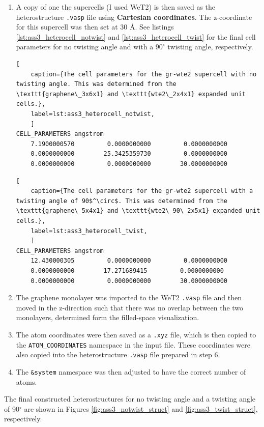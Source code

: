 \documentclass[10pt,a4paper]{labreport}
\begin{document}
\begin{enumerate}
  \item A copy of one the supercells (I used WeT2) is then saved as the heterostructure \texttt{.vasp} file using \textbf{Cartesian coordinates}. The z-coordinate for this supercell was then set at 30 \AA. See listings \ref{lst:ass3_heterocell_notwist} and \ref{lst:ass3_heterocell_twist} for the final cell parameters for no twisting angle and with a $90^\circ$ twisting angle, respectively.
\begin{lstlisting}[ 
    caption={The cell parameters for the gr-wte2 supercell with no twisting angle. This was determined from the \texttt{graphene\_3x6x1} and \texttt{wte2\_2x4x1} expanded unit cells.},
    label=lst:ass3_heterocell_notwist,
    ]
CELL_PARAMETERS angstrom
    7.1900000570         0.0000000000         0.0000000000
    0.0000000000        25.3425359730         0.0000000000
    0.0000000000         0.0000000000        30.0000000000
\end{lstlisting}

\begin{lstlisting}[ 
    caption={The cell parameters for the gr-wte2 supercell with a twisting angle of 90$^\circ$. This was determined from the \texttt{graphene\_5x4x1} and \texttt{wte2\_90\_2x5x1} expanded unit cells.},
    label=lst:ass3_heterocell_twist,
    ]
CELL_PARAMETERS angstrom
    12.430000305         0.0000000000         0.0000000000
    0.0000000000        17.271689415         0.0000000000
    0.0000000000         0.0000000000        30.0000000000
\end{lstlisting} 
  \item  The graphene monolayer was imported to the WeT2 \texttt{.vasp} file and then moved in the z-direction such that there was no overlap between the two monolayers, determined form the filled-space visualization. 
  \item The atom coordinates were then saved as a \texttt{.xyz} file, which is then copied to the \texttt{ATOM\_COORDINATES} namespace in the input file. These coordinates were also copied into the heterostructure \texttt{.vasp} file prepared in step 6. 
  \item The \texttt{\&system} namespace was then adjusted to have the correct number of atoms.
\end{enumerate}

The final constructed heterostructures for no twisting angle and a twisting angle of 90$^\circ$ are shown in Figures \ref{fig:ass3_notwist_struct} and \ref{fig:ass3_twist_struct}, respectively. 
\end{document}

